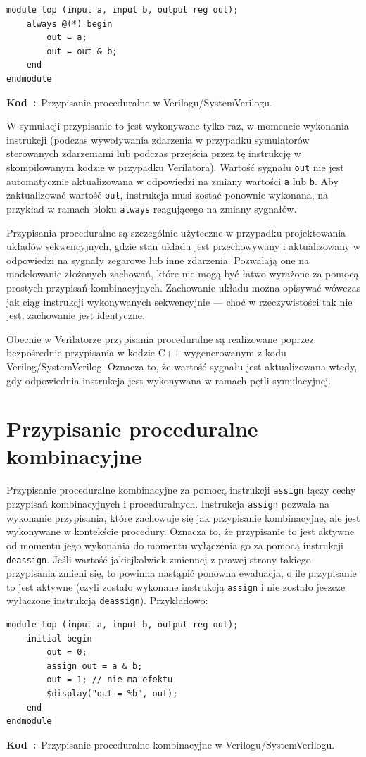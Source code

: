 \documentclass[shortabstract, inz]{iithesis}
\newcounter{kod}[chapter]
\renewcommand{\thekod}{\thechapter\arabic{kod}}
\newcommand{\codecaption}[2]{%
  \par\refstepcounter{kod}\label{#1}%
  \noindent\textbf{Kod~\thekod:}~#2\par
  \vspace*{1.0\baselineskip}%
}
\begin{document}
\begin{verbatim}
module top (input a, input b, output reg out);
    always @(*) begin
        out = a;
        out = out & b;
    end
endmodule
\end{verbatim}
\codecaption{lst:proc-assign}{Przypisanie proceduralne w Verilogu/SystemVerilogu.}

W symulacji przypisanie to jest wykonywane tylko raz, w momencie wykonania instrukcji (podczas wywoływania zdarzenia w przypadku symulatorów sterowanych zdarzeniami lub podczas przejścia przez tę instrukcję w skompilowanym kodzie w przypadku Verilatora). Wartość sygnału \texttt{out} nie jest automatycznie aktualizowana w odpowiedzi na zmiany wartości \texttt{a} lub \texttt{b}. Aby zaktualizować wartość \texttt{out}, instrukcja musi zostać ponownie wykonana, na przykład w ramach bloku \texttt{always} reagującego na zmiany sygnałów.

Przypisania proceduralne są szczególnie użyteczne w przypadku projektowania układów sekwencyjnych, gdzie stan układu jest przechowywany i aktualizowany w odpowiedzi na sygnały zegarowe lub inne zdarzenia. Pozwalają one na modelowanie złożonych zachowań, które nie mogą być łatwo wyrażone za pomocą prostych przypisań kombinacyjnych. Zachowanie układu można opisywać wówczas jak ciąg instrukcji wykonywanych sekwencyjnie --- choć w rzeczywistości tak nie jest, zachowanie jest identyczne.

Obecnie w Verilatorze przypisania proceduralne są realizowane poprzez bezpośrednie przypisania w kodzie C++ wygenerowanym z kodu Verilog/SystemVerilog. Oznacza to, że wartość sygnału jest aktualizowana wtedy, gdy odpowiednia instrukcja jest wykonywana w ramach pętli symulacyjnej.

\section{Przypisanie proceduralne kombinacyjne}
Przypisanie proceduralne kombinacyjne za pomocą instrukcji \texttt{assign} łączy cechy przypisań kombinacyjnych i proceduralnych. Instrukcja \texttt{assign} pozwala na wykonanie przypisania, które zachowuje się jak przypisanie kombinacyjne, ale jest wykonywane w kontekście procedury. Oznacza to, że przypisanie to jest aktywne od momentu jego wykonania do momentu wyłączenia go za pomocą instrukcji \texttt{deassign}.
Jeśli wartość jakiejkolwiek zmiennej z prawej strony takiego przypisania zmieni się, to powinna nastąpić ponowna ewaluacja, o ile przypisanie to jest aktywne (czyli zostało wykonane instrukcją \texttt{assign} i nie zostało jeszcze wyłączone instrukcją \texttt{deassign}).
Przykładowo:
\begin{verbatim}
module top (input a, input b, output reg out);
    initial begin
        out = 0;
        assign out = a & b;
        out = 1; // nie ma efektu
        $display("out = %b", out);
    end
endmodule
\end{verbatim}
\codecaption{lst:proc-cont-assign}{Przypisanie proceduralne kombinacyjne w Verilogu/SystemVerilogu.}
\end{document}
